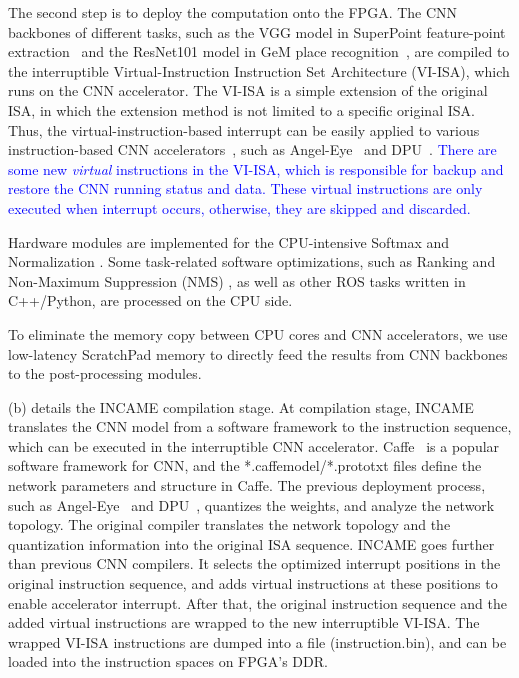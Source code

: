The second step is to deploy the computation onto the FPGA. 
The CNN backbones of different tasks, such as the VGG model in SuperPoint feature-point extraction~\cite{detone2018superpoint} and the ResNet101 model in GeM place recognition~\cite{radenovic2018fine}, are compiled to the interruptible Virtual-Instruction Instruction Set Architecture (VI-ISA), which runs on the CNN accelerator. The VI-ISA is a simple extension of the original ISA, in which the extension method is not limited to a specific original ISA. Thus, the virtual-instruction-based interrupt can be easily applied to various instruction-based CNN accelerators~\cite{yu2018instruction,qiu2016going}, such as Angel-Eye~\cite{guo2017angel} and DPU~\cite{dpu}.
\textcolor{blue}{
There are some new \textit{virtual} instructions in the VI-ISA, which is responsible for backup and restore the CNN running status and data. These virtual instructions are only executed when interrupt occurs, otherwise, they are skipped and discarded.
}


Hardware modules are implemented for the CPU-intensive Softmax \cite{Softmax-wiki} and Normalization \cite{Norm}. Some task-related software optimizations, such as Ranking and Non-Maximum Suppression (NMS) \cite{NeubeckGool-NMS}, as well as other ROS tasks written in C++/Python, are processed on the CPU side.

To eliminate the memory copy between CPU cores and CNN accelerators, we use low-latency ScratchPad memory \cite{Banakar2002Scratchpad} to directly feed the results from CNN backbones to the post-processing modules. 

(b) details the INCAME compilation stage. At compilation stage, INCAME translates the CNN model from a software framework to the instruction sequence, which can be executed in the interruptible CNN accelerator. Caffe~\cite{jia2014caffe} is a popular software framework for CNN, and the *.caffemodel/*.prototxt files define the network parameters and structure in Caffe. The previous deployment process, such as Angel-Eye~\cite{guo2017angel} and DPU~\cite{dpu}, quantizes the weights, and analyze the network topology. The original compiler translates the network topology and the quantization information into the original ISA sequence. INCAME goes further than previous CNN compilers. It selects the optimized interrupt positions in the original instruction sequence, and adds virtual instructions at these positions to enable accelerator interrupt. After that, the original instruction sequence and the added virtual instructions are wrapped to the new interruptible VI-ISA. The wrapped VI-ISA instructions are dumped into a file (instruction.bin), and can be loaded into the instruction spaces on FPGA's DDR.


